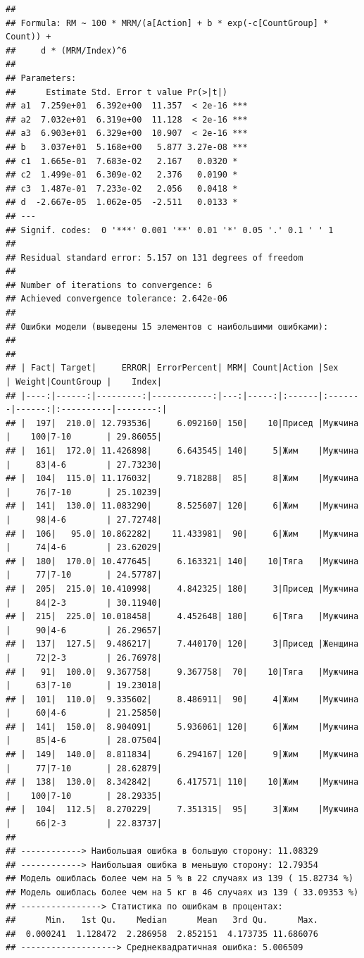 \documentclass[
]{article}
\begin{document}
\begin{verbatim}
## 
## Formula: RM ~ 100 * MRM/(a[Action] + b * exp(-c[CountGroup] * Count)) + 
##     d * (MRM/Index)^6
## 
## Parameters:
##      Estimate Std. Error t value Pr(>|t|)    
## a1  7.259e+01  6.392e+00  11.357  < 2e-16 ***
## a2  7.032e+01  6.319e+00  11.128  < 2e-16 ***
## a3  6.903e+01  6.329e+00  10.907  < 2e-16 ***
## b   3.037e+01  5.168e+00   5.877 3.27e-08 ***
## c1  1.665e-01  7.683e-02   2.167   0.0320 *  
## c2  1.499e-01  6.309e-02   2.376   0.0190 *  
## c3  1.487e-01  7.233e-02   2.056   0.0418 *  
## d  -2.667e-05  1.062e-05  -2.511   0.0133 *  
## ---
## Signif. codes:  0 '***' 0.001 '**' 0.01 '*' 0.05 '.' 0.1 ' ' 1
## 
## Residual standard error: 5.157 on 131 degrees of freedom
## 
## Number of iterations to convergence: 6 
## Achieved convergence tolerance: 2.642e-06
## 
## Ошибки модели (выведены 15 элементов с наибольшими ошибками): 
## 
## 
## | Fact| Target|     ERROR| ErrorPercent| MRM| Count|Action |Sex     | Weight|CountGroup |    Index|
## |----:|------:|---------:|------------:|---:|-----:|:------|:-------|------:|:----------|--------:|
## |  197|  210.0| 12.793536|     6.092160| 150|    10|Присед |Мужчина |    100|7-10       | 29.86055|
## |  161|  172.0| 11.426898|     6.643545| 140|     5|Жим    |Мужчина |     83|4-6        | 27.73230|
## |  104|  115.0| 11.176032|     9.718288|  85|     8|Жим    |Мужчина |     76|7-10       | 25.10239|
## |  141|  130.0| 11.083290|     8.525607| 120|     6|Жим    |Мужчина |     98|4-6        | 27.72748|
## |  106|   95.0| 10.862282|    11.433981|  90|     6|Жим    |Мужчина |     74|4-6        | 23.62029|
## |  180|  170.0| 10.477645|     6.163321| 140|    10|Тяга   |Мужчина |     77|7-10       | 24.57787|
## |  205|  215.0| 10.410998|     4.842325| 180|     3|Присед |Мужчина |     84|2-3        | 30.11940|
## |  215|  225.0| 10.018458|     4.452648| 180|     6|Тяга   |Мужчина |     90|4-6        | 26.29657|
## |  137|  127.5|  9.486217|     7.440170| 120|     3|Присед |Женщина |     72|2-3        | 26.76978|
## |   91|  100.0|  9.367758|     9.367758|  70|    10|Тяга   |Мужчина |     63|7-10       | 19.23018|
## |  101|  110.0|  9.335602|     8.486911|  90|     4|Жим    |Мужчина |     60|4-6        | 21.25850|
## |  141|  150.0|  8.904091|     5.936061| 120|     6|Жим    |Мужчина |     85|4-6        | 28.07504|
## |  149|  140.0|  8.811834|     6.294167| 120|     9|Жим    |Мужчина |     77|7-10       | 28.62879|
## |  138|  130.0|  8.342842|     6.417571| 110|    10|Жим    |Мужчина |    100|7-10       | 28.29335|
## |  104|  112.5|  8.270229|     7.351315|  95|     3|Жим    |Мужчина |     66|2-3        | 22.83737|
## 
## ------------> Наибольшая ошибка в большую сторону: 11.08329 
## ------------> Наибольшая ошибка в меньшую сторону: 12.79354 
## Модель ошиблась более чем на 5 % в 22 случаях из 139 ( 15.82734 %)
## Модель ошиблась более чем на 5 кг в 46 случаях из 139 ( 33.09353 %)
## ----------------> Статистика по ошибкам в процентах:
##      Min.   1st Qu.    Median      Mean   3rd Qu.      Max. 
##  0.000241  1.128472  2.286958  2.852151  4.173735 11.686076 
## -------------------> Среднеквадратичная ошибка: 5.006509
\end{verbatim}
\end{document}
